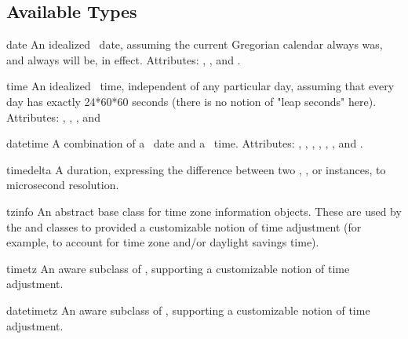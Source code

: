 \subsection{Available Types}

\begin{classdesc}{date}{}
    An idealized \naive\ date, assuming the current Gregorian calendar
    always was, and always will be, in effect.
    Attributes: , , and .
\end{classdesc}

\begin{classdesc}{time}{}
    An idealized \naive\ time, independent of any particular day, assuming
    that every day has exactly 24*60*60 seconds (there is no notion
    of "leap seconds" here).
    Attributes: , , , and 
\end{classdesc}

\begin{classdesc}{datetime}{}
    A combination of a \naive\ date and a \naive\ time.
    Attributes: , , , 
                , , , 
                and .
\end{classdesc}

\begin{classdesc}{timedelta}{}
    A duration, expressing the difference between two ,
    , or  instances, to microsecond
    resolution.
\end{classdesc}

\begin{classdesc}{tzinfo}{}
    An abstract base class for time zone information objects.  These
    are used by the    and  classes to
    provided a customizable notion of time adjustment (for example, to
    account for time zone and/or daylight savings time).
\end{classdesc}

\begin{classdesc}{timetz}{}
    An aware subclass of , supporting a customizable notion of
    time adjustment.
\end{classdesc}

\begin{classdesc}{datetimetz}{}
    An aware subclass of , supporting a customizable notion of
    time adjustment.
\end{classdesc}

